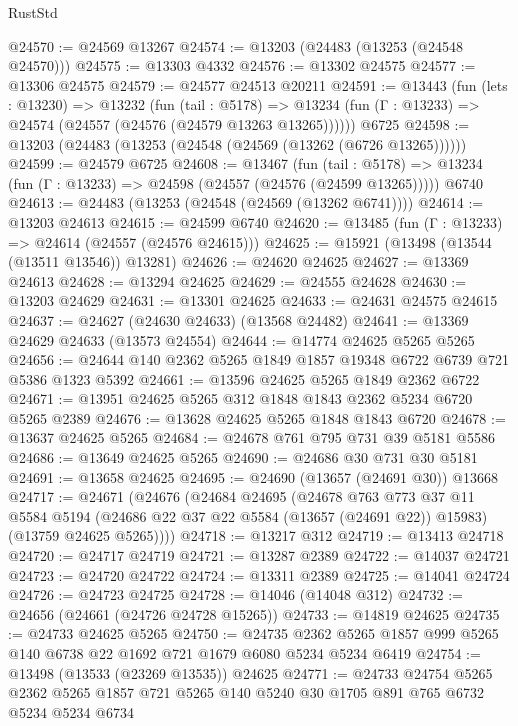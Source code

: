 \begin{lexlean}{RustStd}
\begin{coremodule}
@24570 := @24569 @13267
@24574 := @13203 (@24483 (@13253 (@24548 @24570)))
@24575 := @13303 @4332
@24576 := @13302 @24575
@24577 := @13306 @24575
@24579 := @24577 @24513 @20211
@24591 := @13443
    (fun (lets : @13230) =>
    @13232
      (fun (tail : @5178) =>
      @13234 (fun (Γ : @13233) => @24574 (@24557 (@24576 (@24579 @13263 @13265))))))
    @6725
@24598 := @13203 (@24483 (@13253 (@24548 (@24569 (@13262 (@6726 @13265))))))
@24599 := @24579 @6725
@24608 := @13467
    (fun (tail : @5178) => @13234 (fun (Γ : @13233) => @24598 (@24557 (@24576 (@24599 @13265)))))
    @6740
@24613 := @24483 (@13253 (@24548 (@24569 (@13262 @6741))))
@24614 := @13203 @24613
@24615 := @24599 @6740
@24620 := @13485 (fun (Γ : @13233) => @24614 (@24557 (@24576 @24615)))
@24625 := @15921 (@13498 (@13544 (@13511 @13546)) @13281)
@24626 := @24620 @24625
@24627 := @13369 @24613
@24628 := @13294 @24625
@24629 := @24555 @24628
@24630 := @13203 @24629
@24631 := @13301 @24625
@24633 := @24631 @24575 @24615
@24637 := @24627 (@24630 @24633) (@13568 @24482)
@24641 := @13369 @24629 @24633 (@13573 @24554)
@24644 := @14774 @24625 @5265 @5265
@24656 := @24644 @140 @2362 @5265 @1849 @1857 @19348 @6722 @6739 @721 @5386 @1323 @5392
@24661 := @13596 @24625 @5265 @1849 @2362 @6722
@24671 := @13951 @24625 @5265 @312 @1848 @1843 @2362 @5234 @6720 @5265 @2389
@24676 := @13628 @24625 @5265 @1848 @1843 @6720
@24678 := @13637 @24625 @5265
@24684 := @24678 @761 @795 @731 @39 @5181 @5586
@24686 := @13649 @24625 @5265
@24690 := @24686 @30 @731 @30 @5181
@24691 := @13658 @24625
@24695 := @24690 (@13657 (@24691 @30)) @13668
@24717 := @24671
    (@24676
      (@24684
        @24695
        (@24678
          @763
          @773
          @37
          @11
          @5584
          @5194
          (@24686 @22 @37 @22 @5584 (@13657 (@24691 @22)) @15983)
          (@13759 @24625 @5265))))
@24718 := @13217 @312
@24719 := @13413 @24718
@24720 := @24717 @24719
@24721 := @13287 @2389
@24722 := @14037 @24721
@24723 := @24720 @24722
@24724 := @13311 @2389
@24725 := @14041 @24724
@24726 := @24723 @24725
@24728 := @14046 (@14048 @312)
@24732 := @24656 (@24661 (@24726 @24728 @15265))
@24733 := @14819 @24625
@24735 := @24733 @24625 @5265
@24750 := @24735
    @2362
    @5265
    @1857
    @999
    @5265
    @140
    @6738
    @22
    @1692
    @721
    @1679
    @6080
    @5234
    @5234
    @6419
@24754 := @13498 (@13533 (@23269 @13535)) @24625
@24771 := @24733
    @24754
    @5265
    @2362
    @5265
    @1857
    @721
    @5265
    @140
    @5240
    @30
    @1705
    @891
    @765
    @6732
    @5234
    @5234
    @6734

\end{coremodule}
\end{lexlean}
